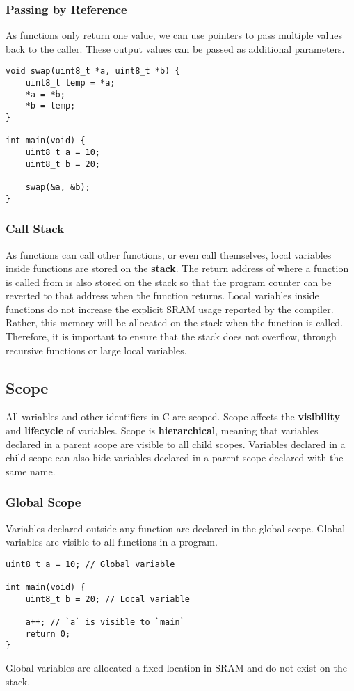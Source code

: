 \documentclass{article}
\begin{document}
\subsubsection{Passing by Reference}
As functions only return one value, we can use pointers to pass
multiple values back to the caller. These output values can be passed
as additional parameters.
\begin{verbatim}
void swap(uint8_t *a, uint8_t *b) {
    uint8_t temp = *a;
    *a = *b;
    *b = temp;
}

int main(void) {
    uint8_t a = 10;
    uint8_t b = 20;

    swap(&a, &b);
}
\end{verbatim}
\subsubsection{Call Stack}
As functions can call other functions, or even call themselves, local
variables inside functions are stored on the \textbf{stack}. The return
address of where a function is called from is also stored on the stack
so that the program counter can be reverted to that address when the
function returns. Local variables inside functions do not increase the
explicit SRAM usage reported by the compiler. Rather, this memory will
be allocated on the stack when the function is called. Therefore, it is
important to ensure that the stack does not overflow, through recursive
functions or large local variables.
\subsection{Scope}
All variables and other identifiers in C are scoped. Scope affects the
\textbf{visibility} and \textbf{lifecycle} of variables. Scope is
\textbf{hierarchical}, meaning that variables declared in a parent
scope are visible to all child scopes. Variables declared in a child
scope can also hide variables declared in a parent scope declared with
the same name.
\subsubsection{Global Scope}
Variables declared outside any function are declared in the global
scope. Global variables are visible to all functions in a program.
\begin{verbatim}
uint8_t a = 10; // Global variable

int main(void) {
    uint8_t b = 20; // Local variable

    a++; // `a` is visible to `main`
    return 0;
}
\end{verbatim}
Global variables are allocated a fixed location in SRAM and do not
exist on the stack.
\end{document}
